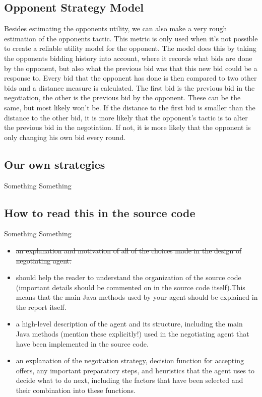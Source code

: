 \subsection{Opponent Strategy Model}
Besides estimating the opponents utility, we can also make a very rough estimation of the opponents tactic. This metric is only used when it's not possible to create a reliable utility model for the opponent. The model does this by taking the opponents bidding history into account, where it records what bids are done by the opponent, but also what the previous bid was that this new bid could be a response to. Every bid that the opponent has done is then compared to two other bids and a distance measure is calculated. The first bid is the previous bid in the negotiation, the other is the previous bid by the opponent. These can be the same, but most likely won't be. If the distance to the first bid is smaller than the distance to the other bid, it is more likely that the opponent's tactic is to alter the previous bid in the negotiation. If not, it is more likely that the opponent is only changing his own bid every round. 

\subsection{Our own strategies}
Something Something\\

\subsection{How to read this in the source code}
Something Something\\

\begin{itemize}
\item \st{an explanation and motivation of all of the choices made in the design of negotiating agent.}
\item should help the reader to understand the organization of the source code (important details should be commented on in the source code itself).This means that the main Java methods used by your agent should be explained in the report itself.
\item a high-level description of the agent and its structure, including the main Java methods (mention these explicitly!) used in the negotiating agent that have been implemented in the source code.
\item an explanation of the negotiation strategy, decision function for accepting offers, any important preparatory steps, and heuristics that the agent uses to decide what to do next, including the factors that have been selected and their combination into these functions.
\end{itemize}